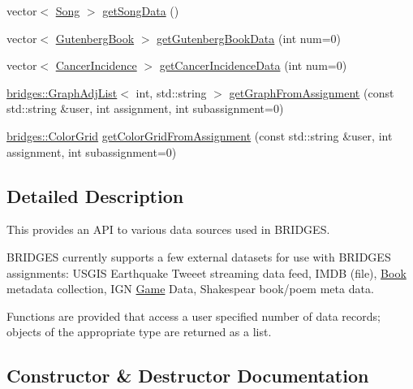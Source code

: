 \begin{DoxyCompactItemize}
\item 
vector$<$ \mbox{\hyperlink{classbridges_1_1_song}{Song}} $>$ \mbox{\hyperlink{classbridges_1_1_data_source_a5e8d035a1becf96c71569e0966e93849}{get\+Song\+Data}} ()
\item 
vector$<$ \mbox{\hyperlink{classbridges_1_1_gutenberg_book}{Gutenberg\+Book}} $>$ \mbox{\hyperlink{classbridges_1_1_data_source_a1057509d6adf4cbfd881854adb274304}{get\+Gutenberg\+Book\+Data}} (int num=0)
\item 
vector$<$ \mbox{\hyperlink{classbridges_1_1_cancer_incidence}{Cancer\+Incidence}} $>$ \mbox{\hyperlink{classbridges_1_1_data_source_a52d8161e7c093ab3615acea7085f6689}{get\+Cancer\+Incidence\+Data}} (int num=0)
\item 
\mbox{\hyperlink{classbridges_1_1_graph_adj_list}{bridges\+::\+Graph\+Adj\+List}}$<$ int, std\+::string $>$ \mbox{\hyperlink{classbridges_1_1_data_source_ac4edf55c163c60f17b13f5499e5d2e65}{get\+Graph\+From\+Assignment}} (const std\+::string \&user, int assignment, int subassignment=0)
\item 
\mbox{\hyperlink{classbridges_1_1_color_grid}{bridges\+::\+Color\+Grid}} \mbox{\hyperlink{classbridges_1_1_data_source_aa65136879011e1ec237380ef8587fea2}{get\+Color\+Grid\+From\+Assignment}} (const std\+::string \&user, int assignment, int subassignment=0)
\end{DoxyCompactItemize}


\subsection{Detailed Description}
This provides an A\+PI to various data sources used in B\+R\+I\+D\+G\+ES. 

B\+R\+I\+D\+G\+ES currently supports a few external datasets for use with B\+R\+I\+D\+G\+ES assignments\+: U\+S\+G\+IS Earthquake Tweeet streaming data feed, I\+M\+DB (file), \mbox{\hyperlink{classbridges_1_1_book}{Book}} metadata collection, I\+GN \mbox{\hyperlink{classbridges_1_1_game}{Game}} Data, Shakespear book/poem meta data.

Functions are provided that access a user specified number of data records; objects of the appropriate type are returned as a list. 

\subsection{Constructor \& Destructor Documentation}
\mbox{\label{classbridges_1_1_data_source_afc95b52d2ca03a92c1f1ee1594a097c7}} 
